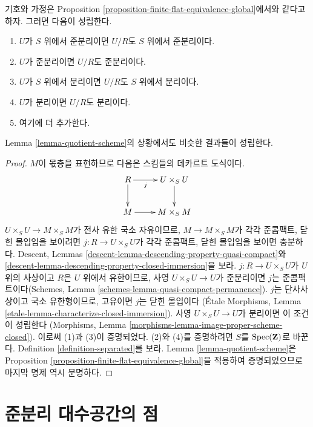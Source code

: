 \begin{lemma}
\label{lemma-quotient-separated}
기호와 가정은 Proposition
\ref{proposition-finite-flat-equivalence-global}에서와 같다고 하자.
그러면 다음이 성립한다.
\begin{enumerate}
\item $U$가 $S$ 위에서 준분리이면 $U/R$도 $S$ 위에서 준분리이다.
\item $U$가 준분리이면 $U/R$도 준분리이다.
\item $U$가 $S$ 위에서 분리이면 $U/R$도 $S$ 위에서 분리이다.
\item $U$가 분리이면 $U/R$도 분리이다.
\item 여기에 더 추가한다.
\end{enumerate}
Lemma \ref{lemma-quotient-scheme}의 상황에서도 비슷한 결과들이 성립한다.
\end{lemma}

\begin{proof}
$M$이 몫층을 표현하므로 다음은 스킴들의 데카르트 도식이다.
$$
\xymatrix{
R \ar[r]_-j \ar[d] & U \times_S U \ar[d] \\
M \ar[r] & M \times_S M
}
$$
$U \times_S U \to M \times_S M$가 전사 유한 국소 자유이므로,
$M \to M \times_S M$가 각각 준콤팩트, 닫힌 몰입임을 보이려면
$j : R \to U \times_S U$가 각각 준콤팩트, 닫힌 몰입임을 보이면 충분하다.
Descent, Lemmas \ref{descent-lemma-descending-property-quasi-compact}와
\ref{descent-lemma-descending-property-closed-immersion}을 보라.
$j : R \to U \times_S U$가 $U$ 위의 사상이고 $R$은 $U$ 위에서
유한이므로, 사영 $U \times_S U \to U$가 준분리이면 $j$는
준콤팩트이다(Schemes, Lemma
\ref{schemes-lemma-quasi-compact-permanence}).
$j$는 단사사상이고 국소 유한형이므로, 고유이면 $j$는 닫힌 몰입이다
(\'Etale Morphisms, Lemma
\ref{etale-lemma-characterize-closed-immersion}). 사영
$U \times_S U \to U$가 분리이면 이 조건이 성립한다
(Morphisms, Lemma \ref{morphisms-lemma-image-proper-scheme-closed}).
이로써 (1)과 (3)이 증명되었다. (2)와 (4)를 증명하려면 $S$를
$\mathop{\mathrm{Spec}}(\mathbf{Z})$로 바꾼다. Definition
\ref{definition-separated}를 보라. Lemma \ref{lemma-quotient-scheme}은
Proposition \ref{proposition-finite-flat-equivalence-global}을 적용하여
증명되었으므로 마지막 명제 역시 분명하다.
\end{proof}

\section{준분리 대수공간의 점}
\label{section-points-quasi-separated}

